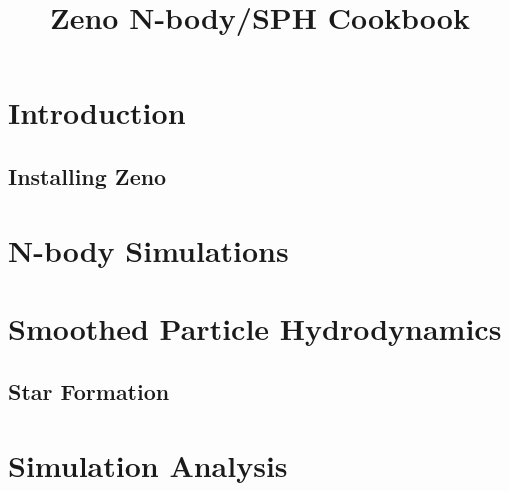 \documentclass[11pt,letterpaper]{article}
\begin{document}
\title{Zeno N-body/SPH Cookbook}

\maketitle

\section{Introduction}

\subsection{Installing Zeno}

\section{N-body Simulations}

\section{Smoothed Particle Hydrodynamics}

\subsection{Star Formation}

\section{Simulation Analysis}
\end{document}
